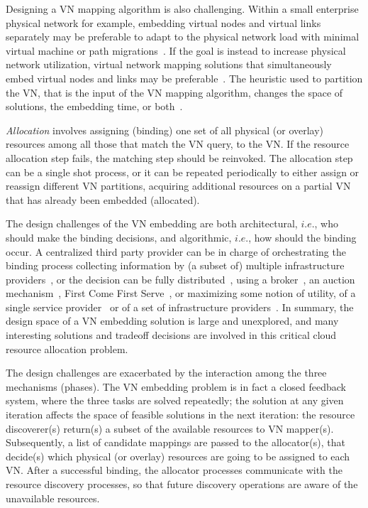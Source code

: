 \documentclass[a4paper, 10pt, conference]{ieeeconf}
\begin{document}
Designing a VN mapping algorithm is also challenging. Within a small enterprise physical network for example, embedding virtual nodes and virtual links separately may be preferable to adapt to the physical network load with minimal virtual machine or path migrations~\cite{pathsplitting}. If the goal is instead to increase physical network utilization, virtual network mapping solutions that simultaneously embed virtual nodes and links may be preferable~\cite{ChowdhuryTON,isomorphism-visa09}. The heuristic used to partition the VN, that is the  input of the VN mapping algorithm, changes the space of solutions, the embedding time, or both~\cite{myPhDThesisTR}.



{\it Allocation} involves assigning (binding) one set of all physical (or overlay) resources among all those that match the VN query, to the VN.  If the resource allocation step fails, the matching step should be reinvoked. 
The allocation step can be a single shot process, or it can be repeated periodically to either assign or reassign different VN partitions, acquiring additional resources on a partial VN that has already been embedded (allocated).

The design challenges of the VN embedding are both architectural, $i.e.$, who should make the binding decisions, and algorithmic, $i.e.$, how should the binding occur.
A centralized third party provider can be in charge of orchestrating the binding process collecting information by (a subset of) multiple infrastructure providers~\cite{Houidi2011,cabernet,Polyvine,pathsplitting}, or the decision can be fully distributed~\cite{CAD,Houidi-distributedVNM,V-Mart}, using a broker~\cite{SHARP}, an auction mechanism~\cite{V-Mart}, First Come First Serve~\cite{sword-journal}, or maximizing some notion of utility, of a single service provider~\cite{pathsplitting} or of a set of infrastructure providers~\cite{CAD}. 
In summary, the design space of a VN embedding solution is large and unexplored, and many interesting solutions and tradeoff decisions are involved in this critical cloud resource allocation problem.

The design challenges are exacerbated by the interaction among the three mechanisms (phases).
The VN embedding problem is in fact a closed feedback system, where the three tasks are solved repeatedly; the solution at any given iteration affects the space of feasible solutions in the next iteration: the resource discoverer(s) return(s) a subset of the available resources to VN mapper(s). Subsequently, a list of candidate mappings are passed to the allocator(s), that decide(s) which physical (or overlay) resources are going to be assigned to each VN. After a successful binding, the allocator processes communicate with the resource discovery processes, so that future discovery operations are aware of the unavailable resources.  
\end{document}
